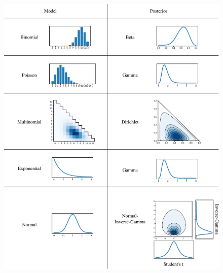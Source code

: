 \newpage
\begin{figure}[!]
	\centering
	\includegraphics[width=\textwidth]{./figs/Exact-Inference-summary.pdf}
\end{figure}
